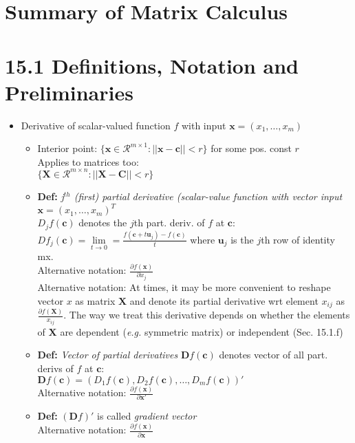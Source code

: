 \documentclass[a4paper]{article}
\newcommand{\eg}{\textit{e.g. }}
\newcommand{\cg}{\color{gray}}
\newcommand{\fs}{\footnotesize}
\begin{document}
\pagestyle{empty}
  
  
\section*{Summary of Matrix Calculus}

\section*{15.1 Definitions, Notation and Preliminaries}
\begin{itemize}
\item Derivative of scalar-valued function $f$ with input $\mathbf{x}=(x_1,\hdots,x_m)$
\begin{itemize}
\setlength{\parindent}{0mm}
\item Interior point: 	$\{\mathbf{x} \in \mathcal{R}^{m\times 1}: ||\mathbf{x}-\mathbf{c}||<r\}$ {\cg 	for some pos. const $r$} \\
{\cg\fs Applies to matrices too:\\
$\{\mathbf{X}\in\mathcal{R}^{m\times n} : ||\mathbf{X}-\mathbf{C}||<r\}$
}
\item \textbf{Def:} \textit{j$^{th}$ (first) partial derivative (scalar-value function with vector input $\mathbf{x}=(x_1,\hdots,x_m)^{T}$} \\
$D_j f(\mathbf{c})$ denotes the $j$th part. deriv. of $f$ at $\mathbf{c}$: \\
$D f_j(\mathbf{c})=\lim\limits_{t\rightarrow 0}=\frac{f(\mathbf{c}+t\mathbf{u}_j)-f(\mathbf{c})}{t}$ {\cg where $\mathbf{u}_j$ is the $j$th row of identity mx.} \\
Alternative notation: $\frac{\partial f(\mathbf{x})}{\partial x_j}$ \\
Alternative notation: At times, it may be more convenient to reshape vector $x$ as matrix $\mathbf{X}$ and denote its partial derivative wrt element $x_{ij}$ as $\frac{\partial f(\mathbf{X})}{x_{ij}}$. The way we treat this derivative depends on whether the elements of $\mathbf{X}$ are dependent (\eg symmetric matrix) or independent (Sec. 15.1.f)

\item \textbf{Def:} \textit{Vector of partial derivatives}
$\mathbf{D} f(\mathbf{c})$ denotes vector of all part. derivs of $f$ at $\mathbf{c}$:\\
$\mathbf{D}f(\mathbf{c}) = (D_1 f(\mathbf{c}), D_2 f(\mathbf{c}), \hdots, D_m f(\mathbf{c}))'$\\
Alternative notation: $\frac{\partial f(\mathbf{x})}{\partial \mathbf{x}'}$
\item \textbf{Def:} $(\mathbf{D}f)'$  is called \textit{gradient vector} \\
Alternative notation: $\frac{\partial f(\mathbf{x})}{\partial \mathbf{x}}$


\end{itemize}
\end{itemize}
\end{document}
